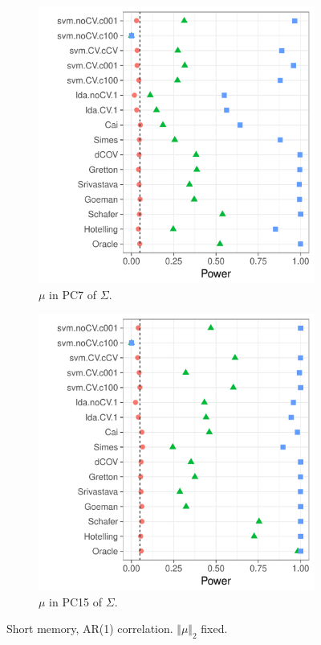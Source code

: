 \documentclass[]{bio}
\begin{document}
\begin{figure}[h]
	\centering
	\begin{subfigure}[t]{.45\columnwidth}
		\centering
		\includegraphics[width=1\columnwidth]{"art/file32"}
		\caption{$\mu$ in PC7 of $\Sigma$.}  
		\label{fig:dependence_41}	
	\end{subfigure}
	\begin{subfigure}[t]{0.45\columnwidth}
		\centering
		\includegraphics[width=1\columnwidth]{"art/file31"}
		\caption{$\mu$ in PC15 of $\Sigma$.}  
		\label{fig:dependence_42}	
	\end{subfigure}
	\caption{Short memory, AR(1) correlation. $\Vert \mu \Vert_2$ fixed. }	
	\label{fig:dependence_4}		
\end{figure}
\end{document}
